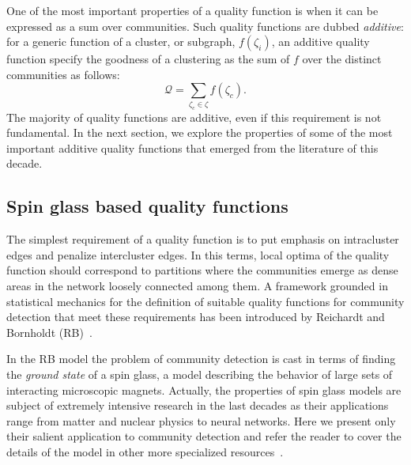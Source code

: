 One of the most important properties of a quality function is when it can be expressed as a sum over communities.
Such quality functions are dubbed \emph{additive}: for a generic function of a cluster, or subgraph, $f(\zeta_i)$, an additive quality function specify the goodness of a clustering as the sum of $f$ over the distinct communities as follows:
\begin{equation}\label{eq:additive_quality}
\mathcal{Q} = \sum \limits_{\zeta_c \in \zeta} f(\zeta_c).
\end{equation}
The majority of quality functions are additive, even if this requirement is not fundamental.
In the next section, we explore the properties of some of the most important additive quality functions that emerged from the literature of this decade.

\subsection{Spin glass based quality functions}
The simplest requirement of a quality function is to put emphasis on intracluster edges and penalize intercluster edges.
In this terms, local optima of the quality function should correspond to partitions where the communities emerge as dense areas in the network loosely connected among them. A framework grounded in statistical mechanics for the definition of suitable quality functions for community detection that meet these requirements has been introduced by Reichardt and Bornholdt (RB)~\cite{reichardt2006}.

In the RB model the problem of community detection is cast in terms of finding the \emph{ground state} of a spin glass, a model describing the behavior of large sets of interacting microscopic magnets.
Actually, the properties of spin glass models are subject of extremely intensive research in the last decades as their applications range from matter and nuclear physics to neural networks. Here we present only their salient application to community detection and refer the reader to cover the details of the model in other more specialized resources~\cite{mezard1990}.

